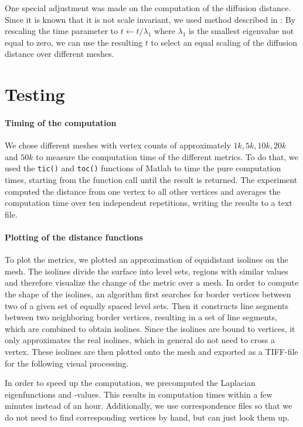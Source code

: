 One special adjustment was made on the computation of the diffusion distance.
Since it is known that it is not scale invariant, we used method described in \cite{lipman2010biharmonic}:
By rescaling the time parameter to $t \leftarrow t/\lambda_1$ where $\lambda_1$ is the smallest eigenvalue not equal to zero, we can use the resulting $t$ to select an equal scaling of the diffusion distance over different meshes.

\section{Testing}
\paragraph{Timing of the computation}
We chose different meshes with vertex counts of approximately $1k, 5k, 10k, 20k$ and $50k$ to measure the computation time of the different metrics.
To do that, we used the \texttt{tic()} and \texttt{toc()} functions of Matlab to time the pure computation times, starting from the function call until the result is returned.
The experiment computed the distance from one vertex to all other vertices and averages the computation time over ten independent repetitions, writing the results to a text file.

\paragraph{Plotting of the distance functions}
To plot the metrics, we plotted an approximation of equidistant isolines on the mesh.
The isolines divide the surface into level sets, regions with similar values and therefore visualize the change of the metric over a mesh.
In order to compute the shape of the isolines, an algorithm first searches for border vertices between two of a given set of equally spaced level sets.
Then it constructs line segments between two neighboring border vertices, resulting in a set of line segments, which are combined to obtain isolines.
Since the isolines are bound to vertices, it only approximates the real isolines, which in general do not need to cross a vertex.
These isolines are then plotted onto the mesh and exported as a TIFF-file for the following visual processing.

In order to speed up the computation, we precomputed the Laplacian eigenfunctions and -values.
This results in computation times within a few minutes instead of an hour.
Additionally, we use correspondence files so that we do not need to find corresponding vertices by hand, but can just look them up.

